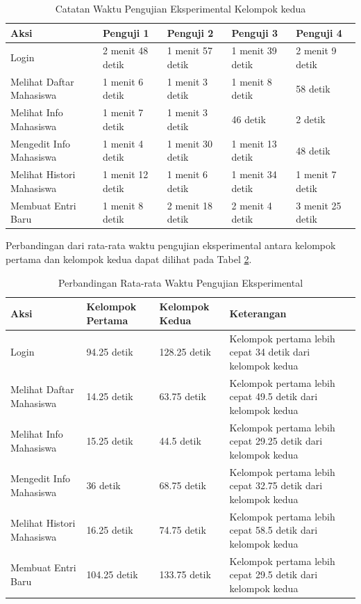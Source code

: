 \begin{table}[h]
\centering
\caption[Tabel 5-3 Catatan Waktu Pengujian Eksperimental Kelompok
Kedua]{Catatan Waktu Pengujian Eksperimental Kelompok kedua}
\label{tab:catatanwaktukelompokkedua}
\begin{tabular}{|p{3cm}|p{1.5cm}|p{1.5cm}|p{1.5cm}|p{1.5cm}|}
\hline
Aksi & Penguji 1 & Penguji 2 & Penguji 3 & Penguji 4\\
\hline
Login & 2 menit 48 detik & 1 menit 57 detik & 1 menit 39 detik & 2 menit 9
detik\\
\hline
Melihat Daftar Mahasiswa & 1 menit 6 detik & 1 menit 3 detik & 1 menit 8 detik &
58 detik\\
\hline
Melihat Info Mahasiswa & 1 menit 7 detik & 1 menit 3 detik & 46 detik & 2
detik\\
\hline
Mengedit Info Mahasiswa & 1 menit 4 detik & 1 menit 30 detik & 1 menit 13 detik
& 48 detik\\
\hline
Melihat Histori Mahasiswa & 1 menit 12 detik & 1 menit 6 detik & 1 menit 34
detik & 1 menit 7 detik\\
\hline
Membuat Entri Baru & 1 menit 8 detik & 2 menit 18 detik & 2 menit 4 detik & 3
menit 25 detik\\
\hline
\end{tabular}
\end{table}

Perbandingan dari rata-rata waktu pengujian eksperimental antara kelompok
pertama dan kelompok kedua dapat dilihat pada Tabel
\ref{tab:perbandinganrataratawaktu}.

\begin{table}[h]
\centering
\caption[Tabel 5-4 Perbandingan Rata-rata Waktu Pengujian
Eksperimental]{Perbandingan Rata-rata Waktu Pengujian Eksperimental}
\label{tab:perbandinganrataratawaktu}
\begin{tabular}{|p{3cm}|l|l|p{3cm}|}
\hline
Aksi & Kelompok Pertama & Kelompok Kedua & Keterangan\\
\hline
Login & 94.25 detik & 128.25 detik & Kelompok pertama lebih cepat 34 detik
dari kelompok kedua\\
\hline
Melihat Daftar Mahasiswa & 14.25 detik & 63.75 detik & Kelompok pertama lebih
cepat 49.5 detik dari kelompok kedua\\
\hline
Melihat Info Mahasiswa & 15.25 detik & 44.5 detik & Kelompok pertama lebih cepat
29.25 detik dari kelompok kedua\\
\hline
Mengedit Info Mahasiswa & 36 detik & 68.75 detik & Kelompok pertama lebih cepat
32.75 detik dari kelompok kedua\\
\hline
Melihat Histori Mahasiswa & 16.25 detik & 74.75 detik & Kelompok pertama lebih
cepat 58.5 detik dari kelompok kedua\\
\hline
Membuat Entri Baru & 104.25 detik & 133.75 detik & Kelompok pertama lebih cepat
29.5 detik dari kelompok kedua\\
\hline
\end{tabular}
\end{table}